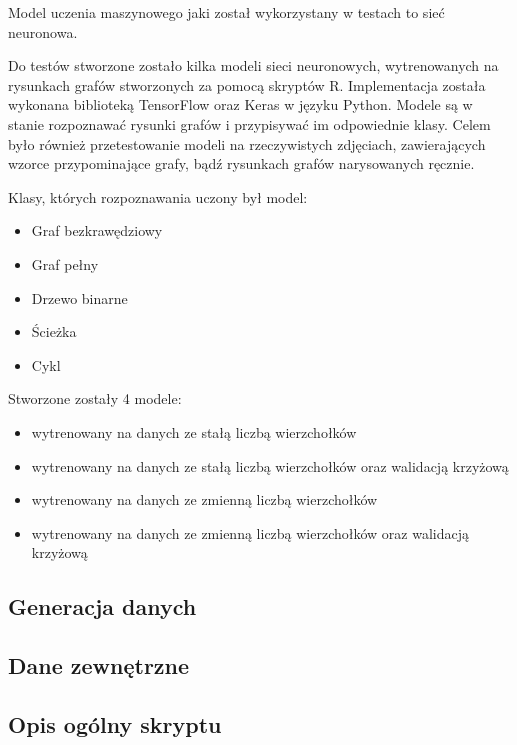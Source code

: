 Model uczenia maszynowego jaki został wykorzystany w testach to sieć neuronowa.

Do testów stworzone zostało kilka modeli sieci neuronowych,
wytrenowanych na rysunkach grafów stworzonych za pomocą skryptów R.
Implementacja została wykonana biblioteką TensorFlow oraz Keras w języku Python.
Modele są w stanie rozpoznawać rysunki grafów i przypisywać im odpowiednie klasy.
Celem było również przetestowanie modeli na rzeczywistych zdjęciach,
zawierających wzorce przypominające grafy, bądź rysunkach grafów narysowanych ręcznie.

Klasy, których rozpoznawania uczony był model:
\begin{itemize}[label=-,labelsep=0.4cm,leftmargin=0.6cm]
	\item Graf bezkrawędziowy
	\item Graf pełny
	\item Drzewo binarne
	\item Ścieżka
	\item Cykl
\end{itemize}

Stworzone zostały 4 modele:
\begin{itemize}[label=-,labelsep=0.4cm,leftmargin=0.6cm]
	\item wytrenowany na danych ze stałą liczbą wierzchołków
	\item wytrenowany na danych ze stałą liczbą wierzchołków oraz walidacją krzyżową
	\item wytrenowany na danych ze zmienną liczbą wierzchołków
	\item wytrenowany na danych ze zmienną liczbą wierzchołków oraz walidacją krzyżową
\end{itemize}

\subsection{Generacja danych}


\subsection{Dane zewnętrzne}


\subsection{Opis ogólny skryptu}
